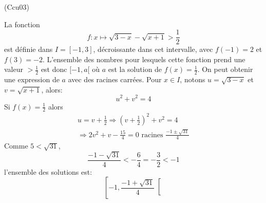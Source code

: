 \begin{tiny}(Ccu03)\end{tiny} La fonction
\begin{displaymath}
  f : x \mapsto \sqrt{3-x}-\sqrt{x+1}>\frac{1}{2}
\end{displaymath}
est définie dans $I=[-1,3]$, décroissante dans cet intervalle, avec $f(-1)=2$ et $f(3)=-2$. L'ensemble des nombres pour lesquels cette fonction prend une valeur $>\frac{1}{2}$ est donc $[-1,a[$ où $a$ est la solution de $f(x)=\frac{1}{2}$.\newline
On peut obtenir une expression de $a$ avec des racines carrées.\newline
Pour $x\in I$, notons $u=\sqrt{3-x}$ et $v=\sqrt{x+1}$, alors:
\begin{displaymath}
  u^2 + v^2 = 4
\end{displaymath}
Si $f(x)=\frac{1}{2}$ alors
\begin{multline*}
  u = v + \frac{1}{2} \Rightarrow
  (v + \frac{1}{2})^2+v^2 = 4 \\
  \Rightarrow 2v^2 + v -\frac{15}{4} = 0
  \text{ racines }
  \frac{-1 \pm \sqrt{31}}{4}
\end{multline*}
Comme $5<\sqrt{31}$,
\begin{displaymath}
  \frac{-1-\sqrt{31}}{4}< -\frac{6}{4}=-\frac{3}{2}<-1
\end{displaymath}
l'ensemble des solutions est:
\begin{displaymath}
  \left[ -1, \frac{-1+\sqrt{31}}{4}\right[ 
\end{displaymath}
